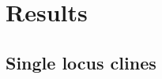 \documentclass[11pt,letterpaper]{article}
\begin{document}


\section*{Results}


\subsection*{Single locus clines}
\end{document}
